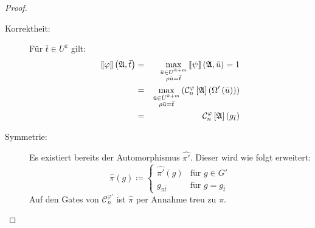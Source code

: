 \begin{proof}
\begin{casenv}
\begin{description}
\item [{Korrektheit:}] Für $\bar{t}\in U^{k}$ gilt: 
\begin{eqnarray*}
\left\llbracket \varphi\right\rrbracket \left(\mathfrak{A},\bar{t}\right) & = & \max_{\begin{subarray}{c}
\bar{u}\in U^{k+m}\\
\rho\bar{u}=\bar{t}
\end{subarray}}\left\llbracket \psi\right\rrbracket \left(\mathfrak{A},\bar{u}\right)=1\\
 & = & \max_{\begin{subarray}{c}
\bar{u}\in U^{k+m}\\
\rho\bar{u}=\bar{t}
\end{subarray}}\left(\mathcal{C}_{n}^{\varphi}\left[\mathfrak{A}\right]\left(\Omega'\left(\bar{u}\right)\right)\right)\\
 & = & \mathcal{C}_{n}^{\varphi}\left[\mathfrak{A}\right]\left(g_{\bar{t}}\right)
\end{eqnarray*}
\item [{Symmetrie:}] Es existiert bereits der Automorphismus $\hat{\pi'}$.
Dieser wird wie folgt erweitert:
\[
\hat{\pi}\left(g\right)\coloneqq\begin{cases}
\hat{\pi'}\left(g\right) & \mathrm{f\ddot{u}r}\,\,g\in G'\\
g_{\pi\bar{t}} & \mathrm{f\ddot{u}r}\,\,g=g_{\bar{t}}
\end{cases}
\]
Auf den Gates von $\mathcal{C}_{n}^{\varphi'}$ ist $\hat{\pi}$ per
Annahme treu zu $\pi$.


\end{description}
\end{casenv}
\end{proof}
